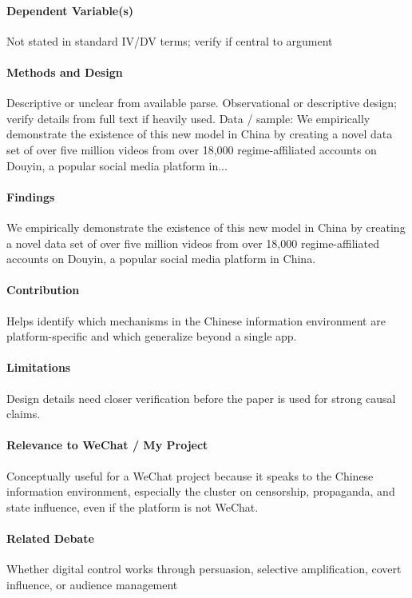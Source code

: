 \documentclass[12pt]{article}
\begin{document}
\paragraph{Dependent Variable(s)} Not stated in standard IV/DV terms; verify if central to argument

\paragraph{Methods and Design} Descriptive or unclear from available parse. Observational or descriptive design; verify details from full text if heavily used. Data / sample: We empirically demonstrate the existence of this new model in China by creating a novel data set of over five million videos from over 18,000 regime-affiliated accounts on Douyin, a popular social media platform in...

\paragraph{Findings} We empirically demonstrate the existence of this new model in China by creating a novel data set of over five million videos from over 18,000 regime-affiliated accounts on Douyin, a popular social media platform in China.

\paragraph{Contribution} Helps identify which mechanisms in the Chinese information environment are platform-specific and which generalize beyond a single app.

\paragraph{Limitations} Design details need closer verification before the paper is used for strong causal claims.

\paragraph{Relevance to WeChat / My Project} Conceptually useful for a WeChat project because it speaks to the Chinese information environment, especially the cluster on censorship, propaganda, and state influence, even if the platform is not WeChat.

\paragraph{Related Debate} Whether digital control works through persuasion, selective amplification, covert influence, or audience management
\end{document}
